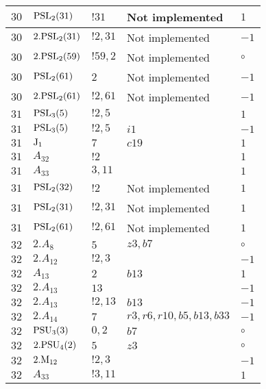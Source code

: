 \documentclass[a4paper, 11pt]{article}
\begin{document}
\begin{longtable}{lllll}
        $ 30 $ & $ {\rm PSL}_{2}(31) $ & $ !31 $ &  Not implemented & $ 1$ \\ \hline
        $ 30 $ & $ 2.{\rm PSL}_{2}(31) $ & $ !2, 31 $ &  Not implemented & $ -1$ \\ \hline
        $ 30 $ & $ 2.{\rm PSL}_{2}(59) $ & $ !59, 2 $ &  Not implemented &  $\circ$ \\ \hline
        $ 30 $ & $ {\rm PSL}_{2}(61) $ & $ 2 $ &  Not implemented & $ -1$ \\ \hline
        $ 30 $ & $ 2.{\rm PSL}_{2}(61) $ & $ !2, 61 $ &  Not implemented & $ -1$ \\ \hline
        $ 31 $ & $ {\rm PSL}_{3}(5) $ & $ ! 2,5 $ & $ ~ $ & $ 1$ \\ \hline
        $ 31 $ & $ {\rm PSL}_{3}(5) $ & $ ! 2,5 $ & $ i1 $ & $ -1$ \\ \hline
        $ 31 $ & $ {\rm J}_1 $ & $ 7 $ & $ c19 $ & $ 1$ \\ \hline
        $ 31 $ & $ A_{32} $ & $ !2 $ & $ ~ $ & $ 1$ \\ \hline
        $ 31 $ & $ A_{33} $ & $ 3, 11 $ & $ ~ $ & $ 1$ \\ \hline
        $ 31 $ & $ {\rm PSL}_{2}(32) $ & $ !2 $ &  Not implemented & $ 1$ \\ \hline
        $ 31 $ & $ {\rm PSL}_{2}(31) $ & $ !2, 31 $ &  Not implemented & $ 1$ \\ \hline
        $ 31 $ & $ {\rm PSL}_{2}(61) $ & $ !2, 61 $ &  Not implemented & $ 1$ \\ \hline
        $ 32 $ & $ 2.A_{8} $ & $ 5 $ & $ z3, b7 $ &  $\circ$ \\ \hline
        $ 32 $ & $ 2.A_{12} $ & $ ! 2,3 $ & $ ~ $ & $ -1$ \\ \hline
        $ 32 $ & $ A_{13} $ & $ 2 $ & $ b13 $ & $ 1$ \\ \hline
        $ 32 $ & $ 2.A_{13} $ & $ 13 $ & $ ~ $ & $ -1$ \\ \hline
        $ 32 $ & $ 2.A_{13} $ & $ ! 2,13 $ & $ b13 $ & $ -1$ \\ \hline
        $ 32 $ & $ 2.A_{14} $ & $ 7 $ & $ r3, r6, r10, b5, b13, b33 $ & $ -1$ \\ \hline
        $ 32 $ & $ {\rm PSU}_{3}(3) $ & $ 0,2 $ & $ b7 $ &  $\circ$ \\ \hline
        $ 32 $ & $ 2.{\rm PSU}_{4}(2) $ & $ 5 $ & $ z3 $ &  $\circ$ \\ \hline
        $ 32 $ & $ 2.{\rm M}_{12} $ & $ ! 2,3 $ & $ ~ $ & $ -1$ \\ \hline
        $ 32 $ & $ A_{33} $ & $ !3, 11 $ & $ ~ $ & $ 1$ \\ \hline

\end{longtable}
\end{document}
